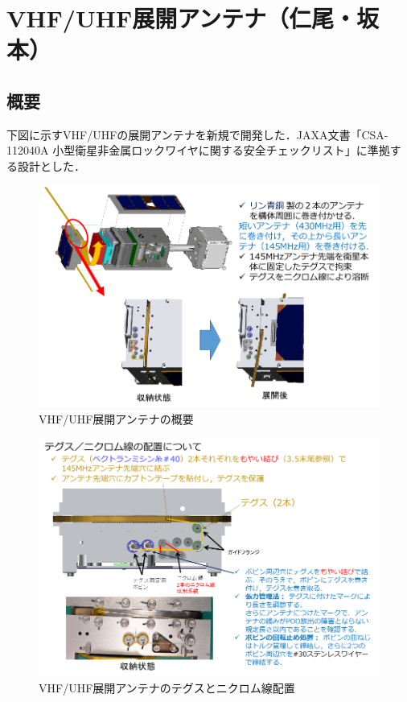 \section{VHF/UHF展開アンテナ（仁尾・坂本）}

\subsection{概要}
下図に示すVHF/UHFの展開アンテナを新規で開発した．JAXA文書「CSA-112040A 小型衛星非金属ロックワイヤに関する安全チェックリスト」に準拠する設計とした．
\begin{figure}[H] 
	\centering
	\includegraphics[scale=1]{03/fig/3-8-1.png}
	\caption{VHF/UHF展開アンテナの概要}
	\label{fig3-8-1}
\end{figure}
\begin{figure}[H]
		\centering
		\includegraphics[scale=1]{03/fig/3-8-2.png}
	\caption{VHF/UHF展開アンテナのテグスとニクロム線配置}
	\label{fig3-8-2}
\end{figure}

